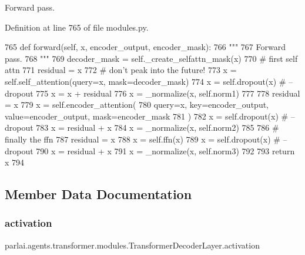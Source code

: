 \begin{DoxyVerb}Forward pass.
\end{DoxyVerb}
 

Definition at line 765 of file modules.\+py.


\begin{DoxyCode}
765     \textcolor{keyword}{def }forward(self, x, encoder\_output, encoder\_mask):
766         \textcolor{stringliteral}{"""}
767 \textcolor{stringliteral}{        Forward pass.}
768 \textcolor{stringliteral}{        """}
769         decoder\_mask = self.\_create\_selfattn\_mask(x)
770         \textcolor{comment}{# first self attn}
771         residual = x
772         \textcolor{comment}{# don't peak into the future!}
773         x = self.self\_attention(query=x, mask=decoder\_mask)
774         x = self.dropout(x)  \textcolor{comment}{# --dropout}
775         x = x + residual
776         x = \_normalize(x, self.norm1)
777 
778         residual = x
779         x = self.encoder\_attention(
780             query=x, key=encoder\_output, value=encoder\_output, mask=encoder\_mask
781         )
782         x = self.dropout(x)  \textcolor{comment}{# --dropout}
783         x = residual + x
784         x = \_normalize(x, self.norm2)
785 
786         \textcolor{comment}{# finally the ffn}
787         residual = x
788         x = self.ffn(x)
789         x = self.dropout(x)  \textcolor{comment}{# --dropout}
790         x = residual + x
791         x = \_normalize(x, self.norm3)
792 
793         \textcolor{keywordflow}{return} x
794 
\end{DoxyCode}


\subsection{Member Data Documentation}
\mbox{\label{classparlai_1_1agents_1_1transformer_1_1modules_1_1TransformerDecoderLayer_a33276633e128020853db98128f1d93c3}} 
\subsubsection{\texorpdfstring{activation}{activation}}
{\footnotesize\ttfamily parlai.\+agents.\+transformer.\+modules.\+Transformer\+Decoder\+Layer.\+activation}



